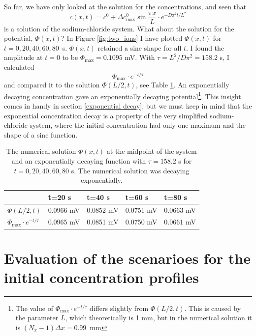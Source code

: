 \documentclass{uiophd}
\begin{document}
So far, we have only looked at the solution for the concentrations, and seen that $$c(x,t) =c^0 + \Delta c^0_{\text{max}} \sin \frac{ \pi x}{L}\cdot e^{-D\pi^2 t /L^2}$$ is a solution of the sodium-chloride system. What about the solution for the potential, $\Phi(x,t)$? In Figure \ref{fig:two_ions} I have plotted $\Phi(x,t)$ for $t=0,20,40,60,80$~s. $\Phi(x,t)$ retained a sine shape for all $t$. I found the amplitude at $t=0$ to be $\Phi_{\text{max}} = 0.1095$ mV. With $\tau = L^2/D\pi^2 = 158.2$ s, I calculated 
$$\Phi_{\text{max}} \cdot e^{-t/{\tau}}$$ and compared it to the solution $\Phi(L/2,t)$, see Table \ref{tab:error2}. An exponentially decaying concentration gave an exponentially decaying potential\footnote{The value of $\Phi_{\text{max}} \cdot e^{-t/{\tau}}$ differs slightly from $\Phi(L/2,t)$. This is caused by the parameter $L$, which theoretically is 1 mm, but in the numerical solution it is $(N_x-1) \Delta x = 0.99$~mm}. This insight comes in handy in section \ref{exponential decay}, but we must keep in mind that the exponential concentration decay is a property of the very simplified sodium-chloride system, where the initial concentration had only one maximum and the shape of a sine function. 

\begin{table}[h!]
  \centering
  \caption{The numerical solution $\Phi(x,t)$ at the midpoint of the system and an exponentially decaying function with $\tau = 158.2$ s for $t=0,20,40,60,80$ s. The numerical solution was decaying exponentially. }
  \label{tab:error2}
  \begin{tabular}{l||l|l|l|l}
 & t=20 s & t=40 s & t=60 s & t=80 s\\
 \hline
$\Phi(L/2,t)$  & 0.0966 mV &  0.0852 mV & 0.0751 mV & 0.0663 mV\\
\hline
$\Phi_{\text{max}} \cdot e^{-t/{\tau}}$  & 0.0965 mV & 0.0851 mV & 0.0750 mV & 0.0661 mV\\


 \end{tabular}
\end{table}


\section{Evaluation of the scenarioes for the initial concentration profiles}\label{The K/Na assumtion}
\end{document}
